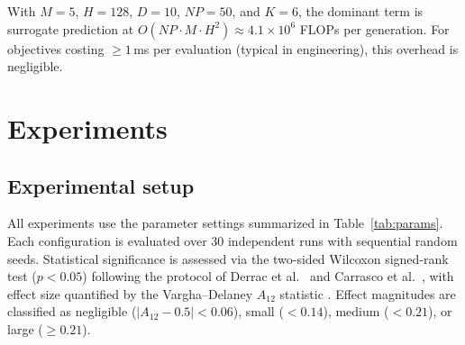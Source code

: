 \documentclass[preprint,12pt,number]{elsarticle}
\begin{document}
With $M = 5$, $H = 128$, $D = 10$, $NP = 50$, and $K = 6$, the dominant term is surrogate prediction at $O(NP \cdot M \cdot H^2) \approx 4.1 \times 10^6$ FLOPs per generation. For objectives costing $\geq 1$\,ms per evaluation (typical in engineering), this overhead is negligible.

\section{Experiments}
\label{sec:experiments}

\subsection{Experimental setup}

All experiments use the parameter settings summarized in Table~\ref{tab:params}. Each configuration is evaluated over 30 independent runs with sequential random seeds. Statistical significance is assessed via the two-sided Wilcoxon signed-rank test ($p < 0.05$) following the protocol of Derrac et al.~\cite{Derrac2011} and Carrasco et al.~\cite{Carrasco2020}, with effect size quantified by the Vargha--Delaney $A_{12}$ statistic \cite{Vargha2000}. Effect magnitudes are classified as negligible ($|A_{12} - 0.5| < 0.06$), small ($< 0.14$), medium ($< 0.21$), or large ($\geq 0.21$).
\end{document}

